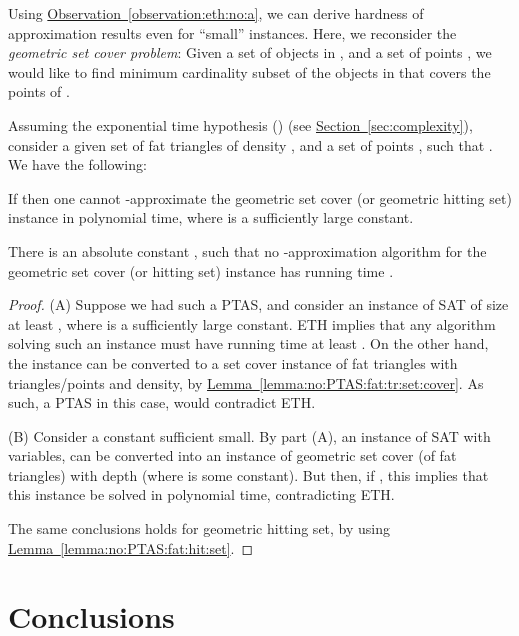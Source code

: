 \documentclass[12pt]{article}
\newcommand{\Term}[1]{\textsf{#1}}
\theoremstyle{remark}\theoremheaderfont{\sf}\theorembodyfont{\upshape}
\numberwithin{figure}{section}\numberwithin{table}{section}\numberwithin{equation}{section}
\newcommand{\HLink}[2]{\hyperref[#2]{#1~\ref*{#2}}}
\newcommand{\HLinkPage}[2]{\hyperref[#2]{#1~\ref*{#2}}}
\newcommand{\seclab}[1]{\label{sec:#1}} \newcommand{\secref}[1]{\HLink{Section}{sec:#1}} \newcommand{\secrefpage}[1]{\HLinkPage{Section}{sec:#1}}
\newcommand{\lemlab}[1]{\label{lemma:#1}}
\newcommand{\lemref}[1]{\HLink{Lemma}{lemma:#1}}
\newcommand{\obsref}[1]{\HLink{Observation}{observation:#1}}
\newcommand{\ETH}{\Term{ETH}\xspace}
\newcommand{\TrSAT}{\ProblemC{SAT}\xspace}
\newcommand{\ProblemC}[1]{\textsf{#1}}
\newcommand{\PTAS}{\Term{PTAS}\xspace}
\begin{document}
Using \obsref{eth:no:a}, we can derive hardness of approximation
results even for ``small'' instances.  Here, we reconsider the
\emph{geometric set cover problem}: Given a set of objects 
in , and a set of points , we would like to find
minimum cardinality subset of the objects in  that covers the
points of .

\begin{lemma}
  \lemlab{e:t:h:g:polylog:d}Assuming the exponential time hypothesis () (see
  \secref{complexity}), consider a given set of fat triangles
   of density , and a set of points ,
  such that .  We have the
  following:
  \begin{compactenum}[\quad(A)]
  \item If  then one cannot
    -approximate the geometric set cover (or geometric
    hitting set) instance  in polynomial time,
    where  is a sufficiently large constant.

  \item There is an absolute constant , such that no
    -approximation algorithm for the geometric set cover (or
    hitting set) instance  has running time
    .
  \end{compactenum}
\end{lemma}
\begin{proof}
  (A) Suppose we had such a \PTAS, and consider an instance
   of \TrSAT of size at least , where  is
  a sufficiently large constant.  \ETH implies that any algorithm
  solving such an instance must have running time at least
  .  On the other hand, the instance 
  can be converted to a set cover instance of fat triangles with
   triangles/points and  density, by
  \lemref{no:PTAS:fat:tr:set:cover}. As such, a \PTAS in this case,
  would contradict \ETH.

  (B) Consider a constant  sufficient small.  By part (A), an
  instance of \TrSAT with  variables, can be converted
  into an instance of geometric set cover (of fat triangles) with
  depth  (where  is some constant). But then, if
  , this implies that this instance be solved in
  polynomial time, contradicting \ETH.

  The same conclusions holds for geometric hitting set, by using
  \lemref{no:PTAS:fat:hit:set}.
\end{proof}


\section{Conclusions}
\seclab{conclusions}
\end{document}
